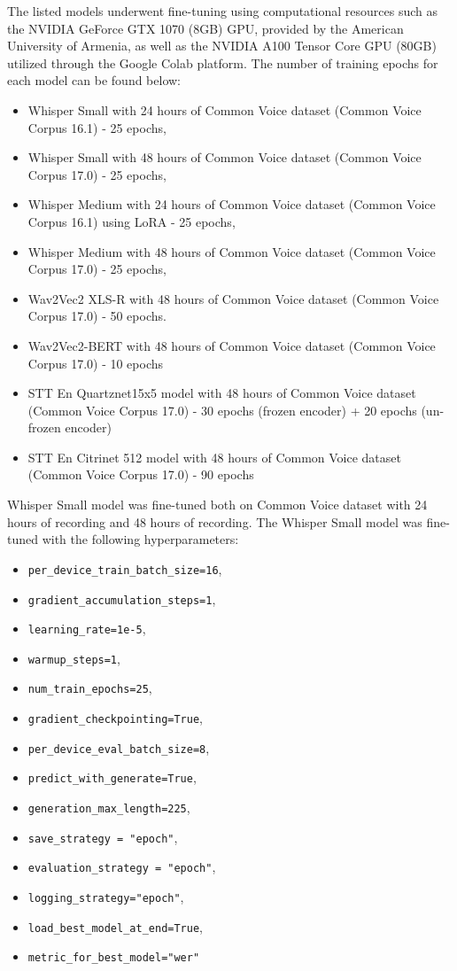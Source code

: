 \documentclass[conference]{IEEEtran}
\begin{document}
The listed models underwent fine-tuning using computational resources such as the NVIDIA GeForce GTX 1070 (8GB) GPU, provided by the American University of Armenia, as well as the NVIDIA A100 Tensor Core GPU (80GB) utilized through the Google Colab platform. The number of training epochs for each model can be found below:
\begin{itemize}
    \item Whisper Small with 24 hours of Common Voice dataset (Common Voice Corpus 16.1) - 25 epochs,
    \item Whisper Small with 48 hours of Common Voice dataset (Common Voice Corpus 17.0) - 25 epochs,
    \item Whisper Medium with 24 hours of Common Voice dataset (Common Voice Corpus 16.1) using LoRA - 25 epochs,
    \item Whisper Medium with 48 hours of Common Voice dataset (Common Voice Corpus 17.0) - 25 epochs,
    \item Wav2Vec2 XLS-R with 48 hours of Common Voice dataset (Common Voice Corpus 17.0) - 50 epochs.
    \item Wav2Vec2-BERT with 48 hours of Common Voice dataset (Common Voice Corpus 17.0) - 10 epochs
    \item STT En Quartznet15x5 model with 48 hours of Common Voice dataset (Common Voice Corpus 17.0) -  30 epochs (frozen encoder) + 20 epochs (un-frozen encoder)
    \item STT En Citrinet 512 model with 48 hours of Common Voice dataset (Common Voice Corpus 17.0) - 90 epochs
    \end{itemize}
\quad Whisper Small model was fine-tuned both on Common Voice dataset with 24 hours of recording and 48 hours of recording. The Whisper Small model was fine-tuned with the following hyperparameters:
\begin{itemize}
    \item \texttt{per\_device\_train\_batch\_size=16},
    \item \texttt{gradient\_accumulation\_steps=1},
    \item \texttt{learning\_rate=1e-5},
    \item \texttt{warmup\_steps=1},
    \item \texttt{num\_train\_epochs=25},
    \item \texttt{gradient\_checkpointing=True},
    \item \texttt{per\_device\_eval\_batch\_size=8},
    \item \texttt{predict\_with\_generate=True},
    \item \texttt{generation\_max\_length=225},
    \item \texttt{save\_strategy = "epoch"},
    \item \texttt{evaluation\_strategy = "epoch"},
    \item \texttt{logging\_strategy="epoch"},
    \item \texttt{load\_best\_model\_at\_end=True},
    \item \texttt{metric\_for\_best\_model="wer"}
    \end{itemize}
\end{document}
